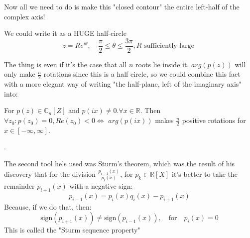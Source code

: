 Now all we need to do is make this "closed contour" the entire
left-half of the complex axis!

We could write it as a {\large HUGE} half-circle
\[
z = Re^{i \theta}, \quad \frac{\pi}{2} \leq \theta \leq \frac{3
\pi}{2}, R \text{ sufficiently large }
\]

The thing is even if it's the case that all $n$ roots lie inside it,
$arg(p(z))$ will only make $\frac{n}{2}$ rotations since this is a
half circle, so we could combine this fact with a more elegant way of
writing "the half-plane, left of the imaginary axis" into:

\begin{lemma}\label{cauchy_arg_lemma}
For $p(z) \in \mathbb{C}_n[Z]$ and $p(ix) \neq 0. \forall x \in
\mathbb{R}$. Then $\forall z_0 : p(z_0) = 0, Re(z_0) < 0 \iff$
$arg(p(ix))$ makes $\frac{n}{2}$ positive rotations for $x \in
[-\infty , \infty]$.
\end{lemma}

.

The second tool he's used was Sturm's theorem, which was the result
of his discovery that for the division $\frac{p_{i-1}(x)}{p_i(x)}$,
for $p_k \in \mathbb{R}[X]$ it's better to take the remainder
$p_{i+1}(x)$ with a negative sign:
\begin{equation}\label{euclid_algorithm}
p_{i-1}(x) = p_i(x) q_i(x) - p_{i+1}(x) \tag{Euclid's Algorithm}
\end{equation}
Because, if we do that, then:
\begin{equation}\label{sturm_seq_property}
\text{sign} ( p_{i+1}(x) )  \neq \text{sign} ( p_{i-1}(x) ), \quad
\text{for} \quad p_i(x)=0 \tag{Sturm. Seq. Property}
\end{equation}
This is called the "Sturm sequence property"

